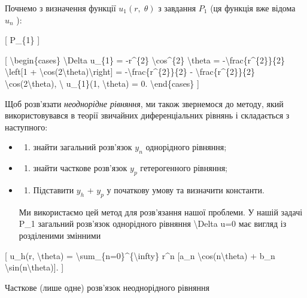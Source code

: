 \documentclass[
]{article}
\providecommand{\tightlist}{%
  \setlength{\itemsep}{0pt}\setlength{\parskip}{0pt}}
\begin{document}
{Почнемо з визначення функції \(u_1\left(r,\;\theta\right)\) з завдання
\(P_1\) (ця функція вже відома \(u_n\) ):

{[} P\_\{1\} {]}

{[} \textbackslash begin\{cases\} \textbackslash Delta u\_\{1\} =
-r\^{}\{2\} \textbackslash cos\^{}\{2\} \textbackslash theta =
-\textbackslash frac\{r\^{}\{2\}\}\{2\} \textbackslash left{[}1 +
\textbackslash cos(2\textbackslash theta)\textbackslash right{]} =
-\textbackslash frac\{r\^{}\{2\}\}\{2\} -
\textbackslash frac\{r\^{}\{2\}\}\{2\}
\textbackslash cos(2\textbackslash theta), \textbackslash{} u\_\{1\}(1,
\textbackslash theta) = 0. \textbackslash end\{cases\} {]}

Щоб розв'язати \emph{неоднорідне рівняння}, ми також звернемося до
методу, який використовувався в теорії звичайних диференціальних рівнянь
і складається з наступного:

\begin{itemize}
\item
  \begin{enumerate}
  \def\labelenumi{\arabic{enumi})}
  \tightlist
  \item
    знайти загальний розв'язок \(y_n\) однорідного рівняння;
  \end{enumerate}
\item
  \begin{enumerate}
  \def\labelenumi{\arabic{enumi})}
  \setcounter{enumi}{1}
  \tightlist
  \item
    знайти часткове розв'язок \(y_p\) гетерогенного рівняння;
  \end{enumerate}
\item
  \begin{enumerate}
  \def\labelenumi{\arabic{enumi})}
  \setcounter{enumi}{2}
  \tightlist
  \item
    Підставити \(y_h\) + \(y_p\) у початкову умову та визначити
    константи.
  \end{enumerate}

  Ми використаємо цей метод для розв'язання нашої проблеми. У нашій
  задачі P\_1 загальний розв'язок однорідного рівняння
  \textbackslash Delta u=0 має вигляд із розділеними змінними
\end{itemize}

{[} u\_h(r, \textbackslash theta) =
\textbackslash sum\_\{n=0\}\^{}\{\textbackslash infty\} r\^{}n {[}a\_n
\textbackslash cos(n\textbackslash theta) + b\_n
\textbackslash sin(n\textbackslash theta){]}. {]}

Часткове (лише одне) розв'язок неоднорідного рівняння

}
\end{document}
